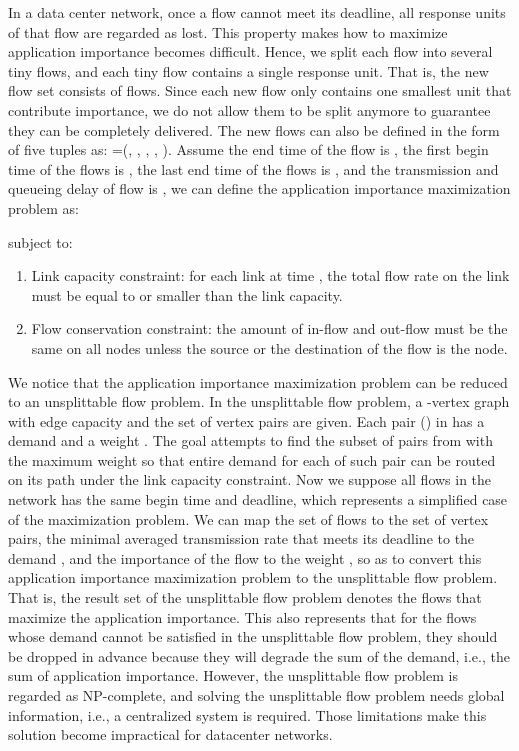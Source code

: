 \documentclass[conference]{IEEEtran}
\begin{document}
In a data center network, once a flow cannot meet its deadline, all response units of that flow are regarded as lost. This property makes how to maximize application importance becomes difficult. Hence, we split each flow into several tiny flows, and each tiny flow contains a single response unit. That is, the new flow set  consists of  flows. Since each new flow only contains one smallest unit that contribute importance, we do not allow them to be split anymore to guarantee they can be completely delivered. The new flows can also be defined in the form of five tuples as: =(, , , , ). Assume the end time of the flow  is , the first begin time of the flows is , the last end time of the flows is , and the transmission and queueing delay of flow  is , we can define the application importance maximization problem as:


subject to:

\begin{enumerate}
\item Link capacity constraint: for each link  at time , the total flow rate on the link must be equal to or smaller than the link capacity.

\item Flow conservation constraint: the amount of in-flow and out-flow must be the same on all nodes unless the source or the destination of the flow is the node.

\end{enumerate}

We notice that the application importance maximization problem can be reduced to an unsplittable flow problem. In the unsplittable flow problem, a -vertex graph  with edge capacity  and the set of  vertex pairs  are given. Each pair () in  has a demand  and a weight . The goal attempts to find the subset of pairs from  with the maximum weight so that entire demand for each of such pair can be routed on its path under the link capacity constraint. Now we suppose all flows in the network has the same begin time and deadline, which represents a simplified case of the maximization problem. We can map the set of  flows to the set of  vertex pairs, the minimal averaged transmission rate  that meets its deadline to the demand , and the importance of the flow  to the weight , so as to convert this application importance maximization problem to the unsplittable flow problem. That is, the result set of the unsplittable flow problem denotes the flows that maximize the application importance. This also represents that for the flows whose demand cannot be satisfied in the unsplittable flow problem, they should be dropped in advance because they will degrade the sum of the demand, i.e., the sum of application importance. However, the unsplittable flow problem is regarded as NP-complete\cite{approximationunsplittable, reducibility}, and solving the unsplittable flow problem needs global information, i.e., a centralized system is required. Those limitations make this solution become impractical for datacenter networks.
\end{document}
